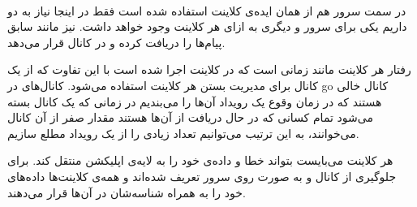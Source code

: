 \documentclass[paper=a4, fontsize=11pt]{article}
\numberwithin{equation}{section} %
\numberwithin{figure}{section} %
\numberwithin{table}{section} %
\begin{document}
\paragraph{}
در سمت سرور هم از همان ایده‌ی کلاینت استفاده شده است فقط در اینجا
نیاز به دو 
داریم یکی برای سرور و دیگری به ازای هر کلاینت وجود خواهد داشت.
 نیز مانند سابق پیام‌ها را دریافت کرده
و در کانال  قرار می‌دهد.

رفتار  هر کلاینت مانند زمانی است که در کلاینت اجرا شده است
با این تفاوت که از یک کانال  برای مدیریت بستن هر کلاینت استفاده می‌شود.
کانال‌های  در go کانال خالی هستند که در زمان وقوع یک رویداد آن‌ها را می‌بندیم
در زمانی که یک کانال بسته می‌شود تمام کسانی که در حال دریافت از آن‌ها هستند مقدار صفر از آن کانال می‌خوانند،
به این ترتیب می‌توانیم تعداد زیادی  را از یک رویداد مطلع سازیم.

هر کلاینت می‌بایست بتواند خطا و داده‌ی خود را به لایه‌ی اپلیکشن منتقل کند. برای جلوگیری از
کانال  و 
به صورت 
روی سرور تعریف شده‌اند و همه‌ی کلاینت‌ها داده‌های خود را به همراه شناسه‌شان در آن‌ها قرار می‌دهند.
\end{document}
